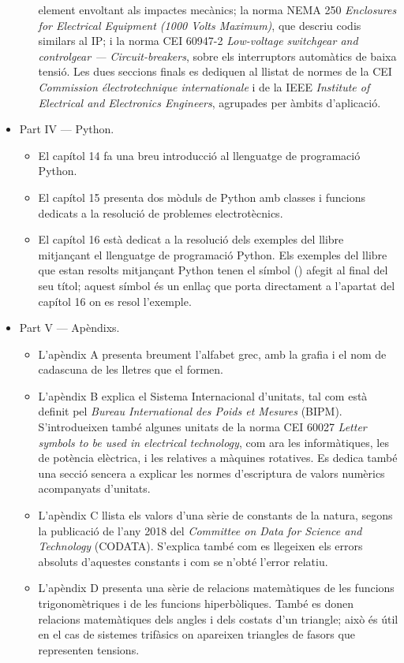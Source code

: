 \begin{itemize}
\begin{itemize}
			element envoltant als impactes mecànics; la norma
			NEMA 250 \textit{Enclosures for Electrical Equipment (1000 Volts Maximum)}, que descriu codis similars al IP; i la norma CEI 60947-2 \textit{Low-voltage switchgear and controlgear --- Circuit-breakers}, sobre els interruptors automàtics de baixa tensió. Les dues seccions finals es dediquen al llistat de normes de la CEI \textit{Commission électrotechnique internationale} i de la IEEE \textit{Institute of Electrical and Electronics Engineers}, agrupades per àmbits d'aplicació.
		\end{itemize}
		\item Part IV --- Python. 
		\begin{itemize}
			\item El capítol 14 fa una breu introducció al llenguatge de programació Python.
			\item El capítol 15 presenta dos mòduls de Python amb classes i funcions dedicats a la resolució de problemes electrotècnics.
			\item El capítol 16 està dedicat  a la resolució dels exemples del llibre mitjançant el llenguatge de programació Python. Els exemples del llibre que estan resolts mitjançant Python tenen el símbol (\faPython) afegit al final del seu títol; aquest símbol és un enllaç que porta directament a l'apartat del capítol 16 on es resol l'exemple.
		\end{itemize}
		\item Part V --- Apèndixs. 
		\begin{itemize}
			\item L'apèndix A presenta breument l'alfabet grec, amb la grafia i el nom de cadascuna de les lletres que el formen.
			\item L'apèndix B explica el Sistema Internacional d'unitats, tal com està definit pel \textit{Bureau International des Poids et Mesures} (BIPM). S'introdueixen també algunes unitats de la norma CEI 60027 \textit{Letter symbols to be used in electrical technology}, com ara les informàtiques, les de potència elèctrica, i les relatives a màquines rotatives. Es dedica també una secció sencera a explicar les normes d'escriptura de valors numèrics acompanyats d'unitats.
			\item L'apèndix C llista els valors d'una sèrie de constants de la natura, segons la  publicació
			de l’any 2018 del \textit{Committee on Data for
			Science and Technology} (CODATA). S'explica també com es llegeixen els errors absoluts d'aquestes constants i com se n'obté l'error relatiu.
			\item L'apèndix D presenta una sèrie de relacions matemàtiques de les funcions trigonomètriques i de les funcions hiperbòliques. També es donen relacions matemàtiques dels angles i dels costats d'un triangle; això és útil en el cas de sistemes trifàsics on apareixen triangles de fasors que representen tensions.

\end{itemize}
\end{itemize}
